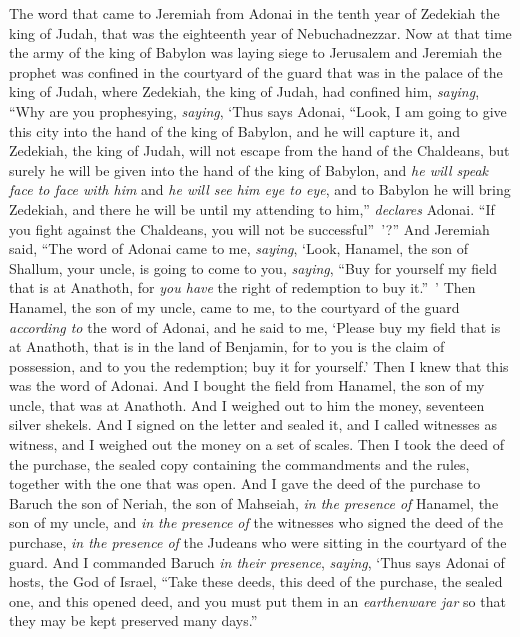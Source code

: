 \begin{biblechapter} %
 The word that came to Jeremiah from Adonai in the tenth year of Zedekiah the king of Judah, that was the eighteenth year of Nebuchadnezzar.
\verse Now at that time the army of the king of Babylon was laying siege to Jerusalem and Jeremiah the prophet was confined in the courtyard of the guard that was in the palace of the king of Judah,
\verse where Zedekiah, the king of Judah, had confined him, \textit{saying}, “Why are you prophesying, \textit{saying}, ‘Thus says Adonai, “Look, I am going to give this city into the hand of the king of Babylon, and he will capture it,
\verse and Zedekiah, the king of Judah, will not escape from the hand of the Chaldeans, but surely he will be given into the hand of the king of Babylon, and \textit{he will speak face to face with him} and \textit{he will see him eye to eye},
\verse and to Babylon he will bring Zedekiah, and there he will be until my attending to him,” \textit{declares} Adonai. “If you fight against the Chaldeans, you will not be successful” ’?”
\verse And Jeremiah said, “The word of Adonai came to me, \textit{saying},
\verse ‘Look, Hanamel, the son of Shallum, your uncle, is going to come to you, \textit{saying}, “Buy for yourself my field that is at Anathoth, for \textit{you have} the right of redemption to buy it.” ’
\verse Then Hanamel, the son of my uncle, came to me, to the courtyard of the guard \textit{according to} the word of Adonai, and he said to me, ‘Please buy my field that is at Anathoth, that is in the land of Benjamin, for to you is the claim of possession, and to you the redemption; buy it for yourself.’ Then I knew that this was the word of Adonai.
\verse And I bought the field from Hanamel, the son of my uncle, that was at Anathoth. And I weighed out to him the money, seventeen silver shekels.
\verse And I signed on the letter and sealed it, and I called witnesses as witness, and I weighed out the money on a set of scales.
\verse Then I took the deed of the purchase, the sealed copy containing the commandments and the rules, together with the one that was open.
\verse And I gave the deed of the purchase to Baruch the son of Neriah, the son of Mahseiah, \textit{in the presence of} Hanamel, the son of my uncle, and \textit{in the presence of} the witnesses who signed the deed of the purchase, \textit{in the presence of} the Judeans who were sitting in the courtyard of the guard.
\verse And I commanded Baruch \textit{in their presence}, \textit{saying},
\verse ‘Thus says Adonai of hosts, the God of Israel, “Take these deeds, this deed of the purchase, the sealed one, and this opened deed, and you must put them in an \textit{earthenware jar} so that they may be kept preserved many days.”

\end{biblechapter}

